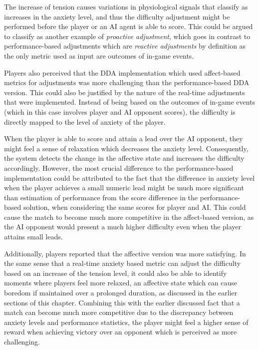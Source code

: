 The increase of tension causes variations in physiological signals that classify as increases in the anxiety level, and thus the difficulty adjustment might be performed before the player or an AI agent is able to score. This could be argued to classify as another example of \emph{proactive adjustment}, which goes in contrast to performance-based adjustments which are \emph{reactive adjustments} by definition as the only metric used as input are outcomes of in-game events. 

Players also perceived that the DDA implementation which used affect-based metrics for adjustments was more challenging than the performance-based DDA version. This could also be justified by the nature of the real-time adjustments that were implemented. Instead of being based on the outcomes of in-game events (which in this case involves player and AI opponent scores), the difficulty is directly mapped to the level of anxiety of the player.

When the player is able to score and attain a lead over the AI opponent, they might feel a sense of relaxation which decreases the anxiety level. Consequently, the system detects the change in the affective state and increases the difficulty accordingly. However, the most crucial difference to the performance-based implementation could be attributed to the fact that the difference in anxiety level when the player achieves a small numeric lead might be much more significant than estimation of performance from the score difference in the performance-based solution, when considering the same scores for player and AI. This could cause the match to become much more competitive in the affect-based version, as the AI opponent would present a much higher difficulty even when the player attains small leads.

Additionally, players reported that the affective version was more satisfying. In the same sense that a real-time anxiety based metric can adjust the difficulty based on an increase of the tension level, it could also be able to identify moments where players feel more relaxed, an affective state which can cause boredom if maintained over a prolonged duration, as discussed in the earlier sections of this chapter. Combining this with the earlier discussed fact that a match can become much more competitive due to the discrepancy between anxiety levels and performance statistics, the player might feel a higher sense of reward when achieving victory over an opponent which is perceived as more challenging.


